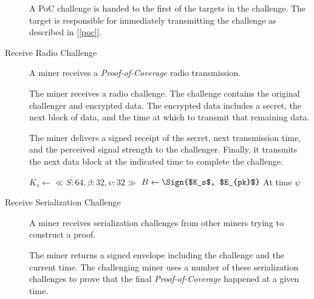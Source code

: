 \documentclass[UTF8, 10pt, nonatbib, nocopyrightspace, reprint]{sigplanconf}
\newenvironment{protocol}[2]{
  \begin{algorithm}[!htb]
    \DontPrintSemicolon
    \caption{#1}\label{#2}
}{
  \end{algorithm}
  \FloatBarrier
}
\newcommand{\secref}[1]{[\autoref{#1}]}
\begin{document}
\begin{description}
    A PoC challenge is handed to the first of the targets in the challenge. The target is responsible for immediately transmitting the challenge as described in \secref{poc}.

    \begin{protocol}{Miner PoC Challenge Transmit}{proto:miner.recv.poc.challenge}

       {
        \;
      }
    \end{protocol}



  \item [Receive Radio Challenge] A miner receives a \emph{Proof-of-Coverage} radio transmission.

    The miner receives a radio challenge. The challenge contains the original challenger and encrypted data. The encrypted data includes a secret, the next block of data, and the time at which to transmit that remaining data.

    The miner delivers a signed receipt of the secret, next transmission time, and the perceived signal strength to the challenger. Finally, it transmits the next data block at the indicated time to complete the challenge.

    \begin{protocol}{Miner Receive Radio Challenge}{proto:miner.recv.challenge.radio}

       {
         {
           {
            $K_s \leftarrow \ll S:64, \beta:32, \upsilon:32 \gg $\;
            $B \leftarrow \Sign{$K_s$, $E_{pk}$} $\;
            \;
            At time $\psi$ \;
          }
        }
      }
    \end{protocol}


  \item [Receive Serialization Challenge] A miner receives serialization challenges from other miners trying to construct a proof.

    The miner returns a signed envelope including the challenge and the current time. The challenging miner uses a number of these serialization challenges to prove that the final \emph{Proof-of-Coverage} happened at a given time.


\end{description}
\end{document}

